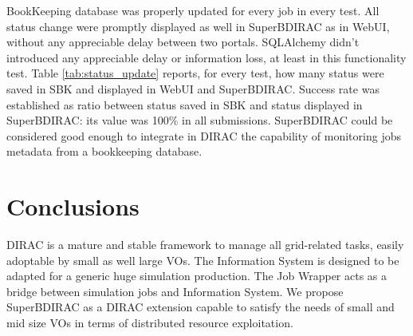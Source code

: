 \documentclass[journal]{IEEEtran}
\begin{document}
BookKeeping database was properly updated for every job in every test. All status change were promptly displayed as well in SuperBDIRAC as in WebUI, without any appreciable delay between two portals. SQLAlchemy didn't introduced any appreciable delay or information loss, at least in this functionality test. 
Table \ref{tab:status_update} reports, for every test, how many status were saved in SBK and displayed in WebUI and SuperBDIRAC. Success rate was established as ratio between status saved in SBK and status displayed in SuperBDIRAC: its value was 100\% in all submissions.
SuperBDIRAC could be considered good enough to integrate in DIRAC the capability of monitoring jobs metadata from a bookkeeping database.

\section{Conclusions}
DIRAC is a mature and stable framework to manage all grid-related tasks, easily adoptable by small as well large VOs.
The Information System is designed to be adapted for a generic huge simulation production.
The Job Wrapper acts as a bridge between simulation jobs and Information System.
We propose SuperBDIRAC as a DIRAC extension capable to satisfy the needs of small and mid size VOs in terms of distributed
resource exploitation.




\end{document}
